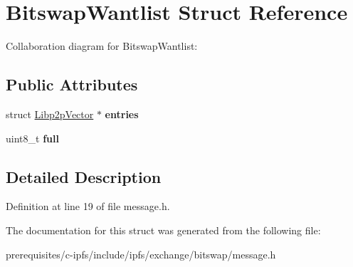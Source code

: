 \hypertarget{struct_bitswap_wantlist}{}\section{Bitswap\+Wantlist Struct Reference}
\label{struct_bitswap_wantlist}


Collaboration diagram for Bitswap\+Wantlist\+:
\subsection*{Public Attributes}
\begin{DoxyCompactItemize}
\item 
\mbox{\label{struct_bitswap_wantlist_adb1fb2d06367dcdd14e0b50909dfc530}} 
struct \mbox{\hyperlink{struct_libp2p_vector}{Libp2p\+Vector}} $\ast$ {\bfseries entries}
\item 
\mbox{\label{struct_bitswap_wantlist_a4e4d598d4375eafffe1238c725c80c5c}} 
uint8\+\_\+t {\bfseries full}
\end{DoxyCompactItemize}


\subsection{Detailed Description}


Definition at line 19 of file message.\+h.



The documentation for this struct was generated from the following file\+:\begin{DoxyCompactItemize}
\item 
prerequisites/c-\/ipfs/include/ipfs/exchange/bitswap/message.\+h\end{DoxyCompactItemize}
